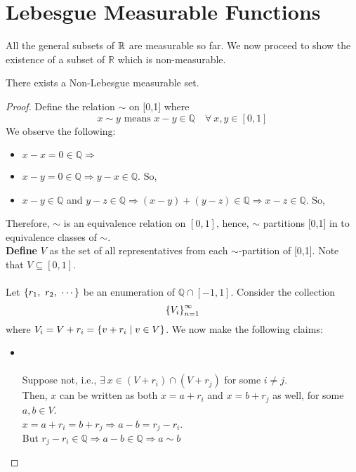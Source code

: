 \documentclass[a4paper]{book}
\begin{document}
\chapter{Lebesgue Measurable Functions}
All the general subsets of $\mathbb{R}$ are measurable so far. We now proceed to show the existence of a subset of $\mathbb{R }$ which is non-measurable.
\begin{theorem}[Vitali]
There exists a Non-Lebesgue measurable set.
\begin{proof}
Define the relation $\sim$ on [0,1] where \[ x \sim y \text{ means } x - y \in \mathbb{Q}\quad \forall\ x,y \in [0,1] \]
We observe the following:
\begin{itemize}
\item $x-x = 0 \in \mathbb{Q} \Rightarrow$ 
\item $x-y = 0 \in \mathbb{Q} \Rightarrow y-x \in \mathbb{Q}.$ So, 
\item $x - y \in \mathbb{Q}$ and $y - z \in \mathbb{Q} \Rightarrow (x-y) + (y-z) \in \mathbb{Q} \Rightarrow x-z \in \mathbb{Q}$. So, 
\end{itemize}
Therefore, $\sim$ is an equivalence relation on $[0,1]$, hence, $\sim$ partitions [0,1] in to equivalence classes of $\sim$. \\
{\bf Define} $V$ as the set of all representatives from each $\sim$-partition of [0,1]. Note that $V \subseteq [0,1]$. \\ \\ Let $\qty{r_1,\ r_2,\ \cdots}$ be an enumeration of $\mathbb{Q} \cap [-1,1]$. Consider the collection \[ \qty{V_i}_{n=1}^{\infty} \] where  $V_i=V + r_i = \qty{v + r_i \mid v\in V}$. We now make the following claims:
\begin{itemize}
\item \claim {} \\ \\
Suppose not, i.e., $\exists\ x \in (V+r_i) \cap (V + r_j)$ for some $i\neq j$. \\ Then, $x$ can be written as both $x = a + r_i$ and $x = b + r_j$ as well, for some $a,b \in V$. \\
$x = a + r_i = b + r_j \Longrightarrow a-b = r_j - r_i$. \\
But $r_j - r_i \in \mathbb{Q} \Longrightarrow a-b \in \mathbb{Q} \Longrightarrow a \sim b$ \\

\end{itemize}
\end{proof}
\end{theorem}
\end{document}
